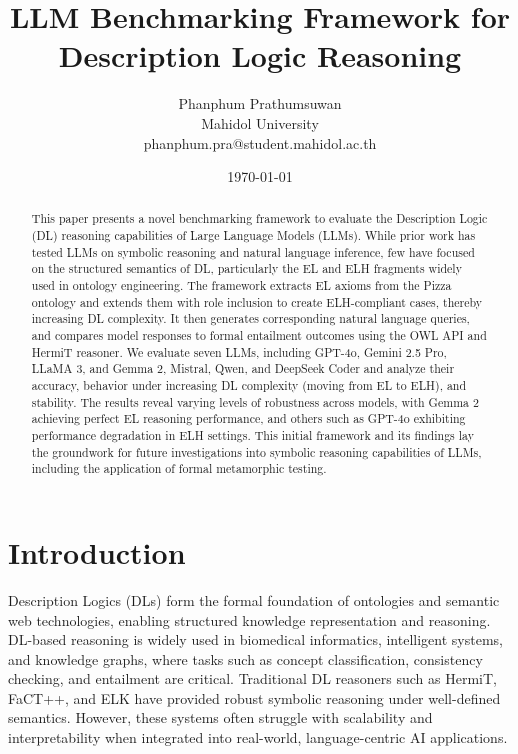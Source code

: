 \documentclass[11pt]{article}
\title{LLM Benchmarking Framework for Description Logic Reasoning}
\author{Phanphum Prathumsuwan\\Mahidol University\\phanphum.pra@student.mahidol.ac.th}
\date{\today}
\begin{document}
\maketitle

\begin{abstract}
This paper presents a novel benchmarking framework to evaluate the Description Logic (DL) reasoning capabilities of Large Language Models (LLMs). 
While prior work has tested LLMs on symbolic reasoning and natural language inference\cite{leapofthought2020,han2022folio}, few have focused on the structured semantics of DL, particularly the EL and ELH fragments widely used in ontology engineering\cite{baader2005el}. 
The framework extracts EL axioms from the Pizza ontology\cite{stanford2025pizza, horridge2004pizza} and extends them with role inclusion to create ELH-compliant cases, thereby increasing DL complexity. It then generates corresponding natural language queries, and compares model responses to formal entailment outcomes using the OWL API\cite{owlapi} and HermiT reasoner\cite{hermit2007, glimm2014hermit}. 
We evaluate seven LLMs, including GPT-4o\cite{gpt4o}, Gemini 2.5 Pro\cite{gemini}, LLaMA 3\cite{llama3}, and Gemma 2\cite{gemma3}, Mistral\cite{mistral}, Qwen\cite{qwen7b}, and DeepSeek Coder\cite{deepseekcoder} and analyze their accuracy, behavior under increasing DL complexity (moving from EL to ELH), and stability. The results reveal varying levels of robustness across models, with Gemma 2 achieving perfect EL reasoning performance, 
and others such as GPT-4o exhibiting performance degradation in ELH settings. 
This initial framework and its findings lay the groundwork for future investigations into symbolic reasoning capabilities of LLMs, including the application of formal metamorphic testing\cite{racharak2025test,chen2018metamorphic}.
\end{abstract}

\section{Introduction}
Description Logics (DLs) form the formal foundation of ontologies and semantic web technologies, enabling structured knowledge representation and reasoning\cite{baader2007description}. 
DL-based reasoning is widely used in biomedical informatics\cite{bodenreider2004biomedical}, intelligent systems, and knowledge graphs\cite{ji2022knowledge}, where tasks such as concept classification, consistency checking, and entailment are critical. 
Traditional DL reasoners such as HermiT\cite{glimm2014hermit}, FaCT++\cite{tsarkov2006fact}, and ELK\cite{kazakov2014elk} have provided robust symbolic reasoning under well-defined semantics. 
However, these systems often struggle with scalability and interpretability when integrated into real-world, language-centric AI applications.
\end{document}
